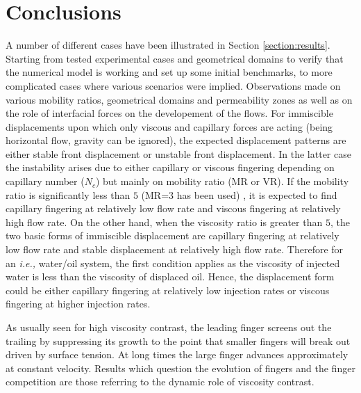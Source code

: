 \documentclass[preprint,authoryear,12pt]{elsarticle}
\newcommand{\ie}{{\it i.e., }}
\begin{document}
\section{Conclusions}\label{Section:Conclusion}

\medskip
A number of different cases have been illustrated in Section \ref{section:results}. Starting from tested experimental cases and geometrical domains to verify that the numerical model is working and set up some initial benchmarks, to more complicated cases where various scenarios were implied. Observations made on various mobility ratios, geometrical domains and permeability zones as well as on the role of interfacial forces on the developement of the flows. For immiscible displacements upon which only viscous and capillary forces are acting (being horizontal flow, gravity can be ignored), the expected displacement patterns are either stable front displacement or unstable front displacement. In the latter case the instability arises due to either capillary or viscous fingering depending on capillary number ($N_{c}$) but mainly on mobility ratio (MR or VR). If the mobility ratio is significantly less than $5$ (MR=$3$ has been used) , it is expected to find capillary fingering at relatively low flow rate and viscous fingering at relatively high flow rate. On the other hand, when the viscosity ratio is greater than $5$, the two basic forms of immiscible displacement are capillary fingering at relatively low flow rate and stable displacement at relatively high flow rate. Therefore for an \ie water/oil system, the first condition applies as the viscosity of injected water is less than the viscosity of displaced oil. Hence, the displacement form could be either capillary fingering at relatively low injection rates or viscous fingering at higher injection rates. 


\medskip
As usually seen for high viscosity contrast, the leading finger screens out the trailing by suppressing its growth to the point that smaller fingers will break out driven by surface tension. At long times the large finger advances approximately at
constant velocity. Results which question the evolution of fingers and the finger competition are those referring to the dynamic role of viscosity contrast.
\end{document}
